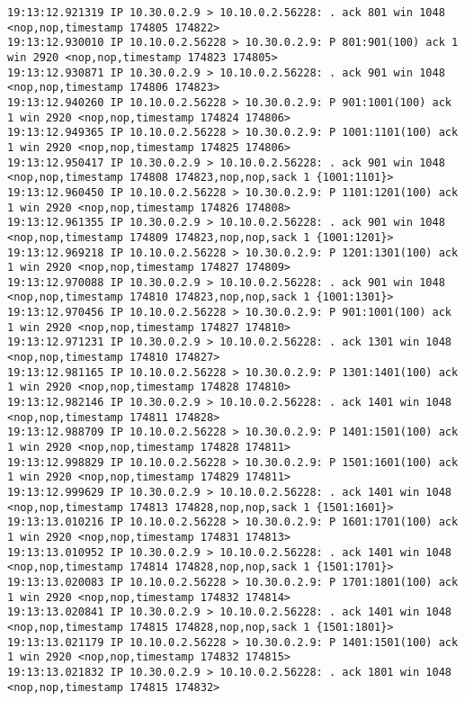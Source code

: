 \documentclass[a4paper,12pt]{article}
\begin{document}
\begin{lstlisting}
19:13:12.921319 IP 10.30.0.2.9 > 10.10.0.2.56228: . ack 801 win 1048 <nop,nop,timestamp 174805 174822>
19:13:12.930010 IP 10.10.0.2.56228 > 10.30.0.2.9: P 801:901(100) ack 1 win 2920 <nop,nop,timestamp 174823 174805>
19:13:12.930871 IP 10.30.0.2.9 > 10.10.0.2.56228: . ack 901 win 1048 <nop,nop,timestamp 174806 174823>
19:13:12.940260 IP 10.10.0.2.56228 > 10.30.0.2.9: P 901:1001(100) ack 1 win 2920 <nop,nop,timestamp 174824 174806>
19:13:12.949365 IP 10.10.0.2.56228 > 10.30.0.2.9: P 1001:1101(100) ack 1 win 2920 <nop,nop,timestamp 174825 174806>
19:13:12.950417 IP 10.30.0.2.9 > 10.10.0.2.56228: . ack 901 win 1048 <nop,nop,timestamp 174808 174823,nop,nop,sack 1 {1001:1101}>
19:13:12.960450 IP 10.10.0.2.56228 > 10.30.0.2.9: P 1101:1201(100) ack 1 win 2920 <nop,nop,timestamp 174826 174808>
19:13:12.961355 IP 10.30.0.2.9 > 10.10.0.2.56228: . ack 901 win 1048 <nop,nop,timestamp 174809 174823,nop,nop,sack 1 {1001:1201}>
19:13:12.969218 IP 10.10.0.2.56228 > 10.30.0.2.9: P 1201:1301(100) ack 1 win 2920 <nop,nop,timestamp 174827 174809>
19:13:12.970088 IP 10.30.0.2.9 > 10.10.0.2.56228: . ack 901 win 1048 <nop,nop,timestamp 174810 174823,nop,nop,sack 1 {1001:1301}>
19:13:12.970456 IP 10.10.0.2.56228 > 10.30.0.2.9: P 901:1001(100) ack 1 win 2920 <nop,nop,timestamp 174827 174810>
19:13:12.971231 IP 10.30.0.2.9 > 10.10.0.2.56228: . ack 1301 win 1048 <nop,nop,timestamp 174810 174827>
19:13:12.981165 IP 10.10.0.2.56228 > 10.30.0.2.9: P 1301:1401(100) ack 1 win 2920 <nop,nop,timestamp 174828 174810>
19:13:12.982146 IP 10.30.0.2.9 > 10.10.0.2.56228: . ack 1401 win 1048 <nop,nop,timestamp 174811 174828>
19:13:12.988709 IP 10.10.0.2.56228 > 10.30.0.2.9: P 1401:1501(100) ack 1 win 2920 <nop,nop,timestamp 174828 174811>
19:13:12.998829 IP 10.10.0.2.56228 > 10.30.0.2.9: P 1501:1601(100) ack 1 win 2920 <nop,nop,timestamp 174829 174811>
19:13:12.999629 IP 10.30.0.2.9 > 10.10.0.2.56228: . ack 1401 win 1048 <nop,nop,timestamp 174813 174828,nop,nop,sack 1 {1501:1601}>
19:13:13.010216 IP 10.10.0.2.56228 > 10.30.0.2.9: P 1601:1701(100) ack 1 win 2920 <nop,nop,timestamp 174831 174813>
19:13:13.010952 IP 10.30.0.2.9 > 10.10.0.2.56228: . ack 1401 win 1048 <nop,nop,timestamp 174814 174828,nop,nop,sack 1 {1501:1701}>
19:13:13.020083 IP 10.10.0.2.56228 > 10.30.0.2.9: P 1701:1801(100) ack 1 win 2920 <nop,nop,timestamp 174832 174814>
19:13:13.020841 IP 10.30.0.2.9 > 10.10.0.2.56228: . ack 1401 win 1048 <nop,nop,timestamp 174815 174828,nop,nop,sack 1 {1501:1801}>
19:13:13.021179 IP 10.10.0.2.56228 > 10.30.0.2.9: P 1401:1501(100) ack 1 win 2920 <nop,nop,timestamp 174832 174815>
19:13:13.021832 IP 10.30.0.2.9 > 10.10.0.2.56228: . ack 1801 win 1048 <nop,nop,timestamp 174815 174832>

\end{lstlisting}
\end{document}
